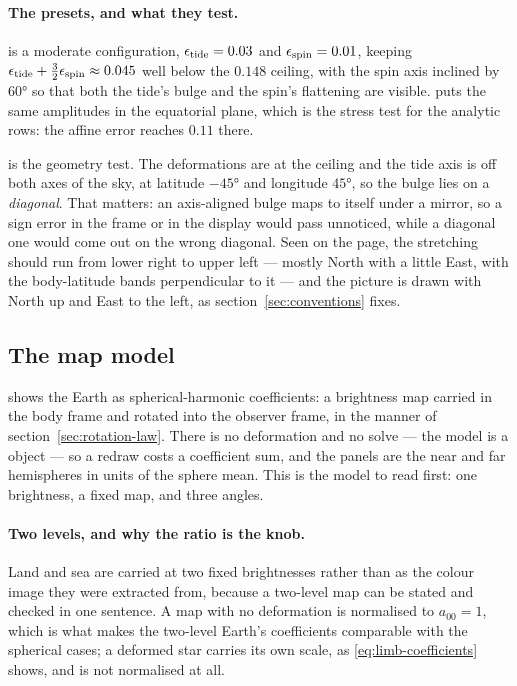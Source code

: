 \paragraph{The presets, and what they test.}   is a moderate configuration,
$\epsilon_\text{tide} = 0.03$ and $\epsilon_\text{spin} = 0.01$, keeping
$\epsilon_\text{tide} + \tfrac32\epsilon_\text{spin} \approx 0.045$ well below the $0.148$
ceiling, with the spin axis inclined by $60°$ so that both the tide's bulge and the spin's
flattening are visible.   puts the same amplitudes in the equatorial plane,
which is the stress test for the analytic rows: the affine error reaches $0.11$ there.

 is the geometry test.  The deformations are at the ceiling and the tide axis
is off both axes of the sky, at latitude $-45°$ and longitude $45°$, so the bulge lies on a
\emph{diagonal}.  That matters: an axis-aligned bulge maps to itself under a mirror, so a
sign error in the frame or in the display would pass unnoticed, while a diagonal one would
come out on the wrong diagonal.  Seen on the page, the stretching should run from lower right
to upper left --- mostly North with a little East, with the body-latitude bands
perpendicular to it --- and the picture is drawn with North up and East to the left, as
section~\ref{sec:conventions} fixes.

\subsection{The map model}
\label{sec:model-map}

 shows the Earth as spherical-harmonic coefficients: a brightness map
carried in the body frame and rotated into the observer frame, in the manner of
section~\ref{sec:rotation-law}.  There is no deformation and no solve --- the model is a
 object --- so a redraw costs a coefficient sum, and the panels are the near and
far hemispheres in units of the sphere mean.  This is the model to read first: one brightness, a
fixed map, and three angles.

\paragraph{Two levels, and why the ratio is the knob.}  Land and sea are carried at two fixed
brightnesses rather than as the colour image they were extracted from, because a two-level map
can be stated and checked in one sentence.  A map with no deformation is normalised to $a_{00} = 1$, which is what makes the two-level
Earth's coefficients comparable with the spherical cases; a deformed star carries its own
scale, as \eqref{eq:limb-coefficients} shows, and is not normalised at all.

